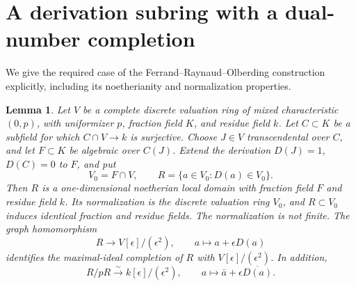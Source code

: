 \documentclass[11pt]{article}
\newtheorem{lemma}[theorem]{Lemma}
\theoremstyle{remark}\newtheorem{remark}[theorem]{Remark}
\begin{document}
\section{A derivation subring with a dual-number completion}

We give the required case of the Ferrand--Raynaud--Olberding construction explicitly, including its noetherianity and normalization properties.

\begin{lemma}\label{lem:ring}
Let $V$ be a complete discrete valuation ring of mixed characteristic $(0,p)$, with uniformizer $p$, fraction field $K$, and residue field $k$. Let $C\subset K$ be a subfield for which $C\cap V\to k$ is surjective. Choose $J\in V$ transcendental over $C$, and let $F\subset K$ be algebraic over $C(J)$. Extend the derivation $D(J)=1$, $D(C)=0$ to $F$, and put
\[
 V_0=F\cap V,\qquad R=\{a\in V_0:D(a)\in V_0\}.
\]
Then $R$ is a one-dimensional noetherian local domain with fraction field $F$ and residue field $k$. Its normalization is the discrete valuation ring $V_0$, and $R\subset V_0$ induces identical fraction and residue fields. The normalization is not finite. The graph homomorphism
\begin{equation}\label{eq:graph}
 R\longrightarrow V[\epsilon]/(\epsilon^2),
 \qquad a\longmapsto a+\epsilon D(a)
\end{equation}
identifies the maximal-ideal completion of $R$ with $V[\epsilon]/(\epsilon^2)$. In addition,
\begin{equation}\label{eq:special}
 R/pR\xrightarrow{\sim}k[\epsilon]/(\epsilon^2),
 \qquad a\longmapsto\bar a+\epsilon\overline{D(a)}.
\end{equation}
\end{lemma}
\end{document}

